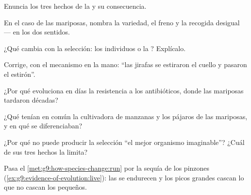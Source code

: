 \begin{exercise}[$\star$]\label{exo:g9:how-species-change:1}
Enuncia los tres hechos de la  y su consecuencia.
\end{exercise}

\begin{exercise}[$\star$]\label{exo:g9:how-species-change:2}
En el caso de las mariposas, nombra la variedad, el freno y la recogida
desigual --- en los dos sentidos.
\end{exercise}

\begin{exercise}[$\star$]\label{exo:g9:how-species-change:3}
¿Qué cambia con la selección: los individuos o la ? Explícalo.
\end{exercise}

\begin{exercise}[$\star$]\label{exo:g9:how-species-change:4}
Corrige, con el mecanismo en la mano: ``las jirafas se estiraron el
cuello y pasaron el estirón''.
\end{exercise}

\begin{exercise}[$\star$]\label{exo:g9:how-species-change:5}
¿Por qué evoluciona en días la resistencia a los antibióticos, donde
las mariposas tardaron décadas?
\end{exercise}

\begin{exercise}[$\star$]\label{exo:g9:how-species-change:6}
¿Qué tenían en común la cultivadora de manzanas y los pájaros de las
mariposas, y en qué se diferenciaban?
\end{exercise}

\begin{exercise}[$\star\star$]\label{exo:g9:how-species-change:7}
¿Por qué no puede producir la selección ``el mejor organismo
imaginable''? ¿Cuál de sus tres hechos la limita?
\end{exercise}

\begin{exercise}[$\star\star$]\label{exo:g9:how-species-change:8}
Pasa el \cref{met:g9:how-species-change:run} por la sequía de los
pinzones (\cref{ex:g9:evidence-of-evolution:live}): las  se
endurecen y los picos grandes cascan lo que no cascan los pequeños.
\end{exercise}

